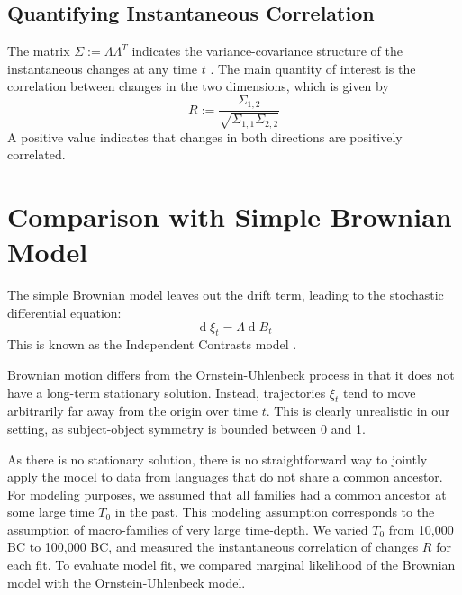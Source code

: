 \documentclass[11pt,a4paper]{article}
\begin{document}
\subsection{Quantifying Instantaneous Correlation}
The matrix $\Sigma := \Lambda\Lambda^T$ indicates the variance-covariance structure of the instantaneous changes at any time $t$ \citep{felsenstein1973maximum, freckleton2012fast}.
The main quantity of interest is the correlation between changes in the two dimensions, which is given by
\begin{equation}
R := \frac{\Sigma_{1,2}}{\sqrt{\Sigma_{1,1}\Sigma_{2,2}}}
\end{equation}
A positive value indicates that changes in both directions are positively correlated.




\section{Comparison with Simple Brownian Model}

The simple Brownian model leaves out the drift term, leading to the stochastic differential equation:
\begin{equation*}
    \operatorname{d}\xi_t = \Lambda \operatorname{d}B_t
\end{equation*}
This is known as the Independent Contrasts model \citep{felsenstein1973maximum, freckleton2012fast}.

Brownian motion differs from the Ornstein-Uhlenbeck process in that it does not have a long-term stationary solution.
Instead, trajectories $\xi_t$ tend to move arbitrarily far away from the origin over time $t$.
This is clearly unrealistic in our setting, as subject-object symmetry is bounded between 0 and 1.

As there is no stationary solution, there is no straightforward way to jointly apply the model to data from languages that do not share a common ancestor.
For modeling purposes, we assumed that all families had a common ancestor at some large time $T_0$ in the past.
This modeling assumption corresponds to the assumption of macro-families of very large time-depth.
We varied $T_0$ from 10,000 BC to 100,000 BC, and measured the instantaneous correlation of changes $R$ for each fit.
To evaluate model fit, we compared marginal likelihood of the Brownian model with the Ornstein-Uhlenbeck model.
\end{document}
